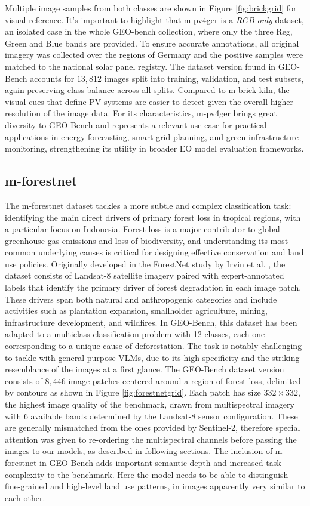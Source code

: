 \documentclass[a4paper, oneside, english]{sapthesis} %
\begin{document}
Multiple image samples from both classes are shown in Figure \ref{fig:brickgrid} for visual reference. It's important to highlight that m-pv4ger is a \emph{RGB-only} dataset, an isolated case in the whole GEO-bench collection, where only the three Reg, Green and Blue bands are provided. To ensure accurate annotations, all original imagery was collected over the regions of Germany and the positive samples were matched to the national solar panel registry. The dataset version found in GEO-Bench accounts for $13,812$ images split into training, validation, and test subsets, again preserving class balance across all splits.
Compared to m-brick-kiln, the visual cues that define PV systems are easier to detect given the overall higher resolution of the image data. For its characteristics, m-pv4ger brings great diversity to GEO-Bench and represents a relevant use-case for practical applications in energy forecasting, smart grid planning, and green infrastructure monitoring, strengthening its utility in broader EO model evaluation frameworks.


\subsection{m-forestnet}

The m-forestnet dataset tackles a more subtle and complex classification task: identifying the main direct drivers of primary forest loss in tropical regions, with a particular focus on Indonesia. Forest loss is a major contributor to global greenhouse gas emissions and loss of biodiversity, and understanding its most common underlying causes is critical for designing effective conservation and land use policies.
Originally developed in the ForestNet study by Irvin et al. \cite{irvin2020forestnet}, the dataset consists of Landsat-8 satellite imagery paired with expert-annotated labels that identify the primary driver of forest degradation in each image patch. These drivers span both natural and anthropogenic categories and include activities such as plantation expansion, smallholder agriculture, mining, infrastructure development, and wildfires.
In GEO-Bench, this dataset has been adapted to a multiclass classification problem with 12 classes, each one corresponding to a unique cause of deforestation. The task is notably challenging to tackle with general-purpose VLMs, due to its high specificity and the striking resemblance of the images at a first glance. The GEO-Bench dataset version consists of $8,446$ image patches centered around a region of forest loss, delimited by contours as shown in Figure \ref{fig:forestnetgrid}. Each patch has size $332 \times 332$, the highest image quality of the benchmark, drawn from multispectral imagery with $6$ available bands determined by the Landsat-8 sensor configuration. These are generally mismatched from the ones provided by Sentinel-2, therefore special attention was given to re-ordering the multispectral channels before passing the images to our models, as described in following sections.
The inclusion of m-forestnet in GEO-Bench adds important semantic depth and increased task complexity to the benchmark. Here the model needs to be able to distinguish fine-grained and high-level land use patterns, in images apparently very similar to each other.
\end{document}
